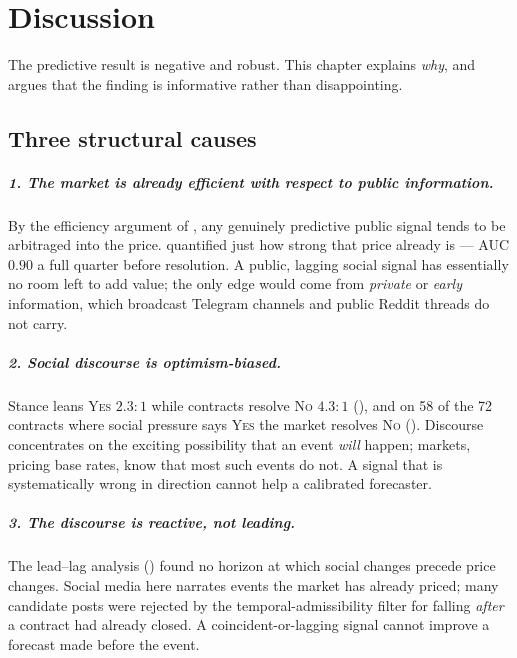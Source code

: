 \chapter{Discussion}
\label{ch:discussion}

The predictive result is negative and robust. This chapter explains \emph{why}, and
argues that the finding is informative rather than disappointing.

\section{Three structural causes}
\paragraph{1. The market is already efficient with respect to public information.}
By the efficiency argument of , any genuinely predictive public
signal tends to be arbitraged into the price.  quantified just how
strong that price already is --- AUC $0.90$ a full quarter before resolution. A public,
lagging social signal has essentially no room left to add value; the only edge would
come from \emph{private} or \emph{early} information, which broadcast Telegram channels
and public Reddit threads do not carry.

\paragraph{2. Social discourse is optimism-biased.}
Stance leans \textsc{Yes} $2.3{:}1$ while contracts resolve \textsc{No} $4.3{:}1$
(), and on 58 of the 72 contracts where social pressure says
\textsc{Yes} the market resolves \textsc{No} (). Discourse concentrates on
the exciting possibility that an event \emph{will} happen; markets, pricing base rates,
know that most such events do not. A signal that is systematically wrong in direction
cannot help a calibrated forecaster.

\paragraph{3. The discourse is reactive, not leading.}
The lead--lag analysis () found no horizon at which social changes
precede price changes. Social media here narrates events the market has already priced; many candidate posts were
rejected by the temporal-admissibility filter for falling \emph{after} a contract had
already closed. A coincident-or-lagging signal cannot improve a forecast made before the
event.

